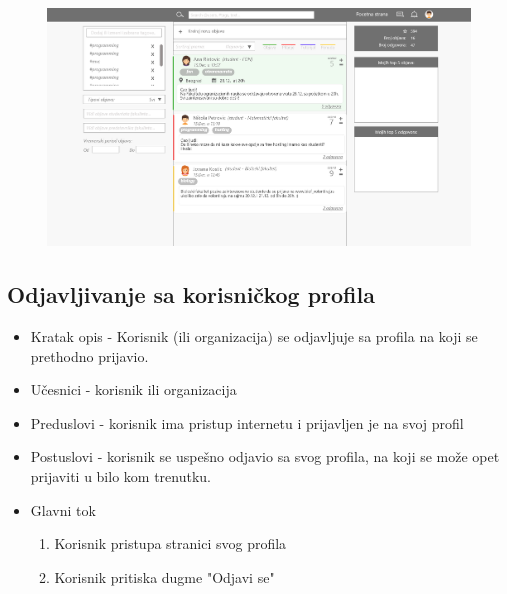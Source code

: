 \begin{figure}[h!]
		\centerline{\includegraphics[width=\textwidth]{slike/pocetna_strana.png}}
\end{figure}

\subsection{Odjavljivanje sa korisničkog profila}
\begin{itemize}
	\item Kratak opis - Korisnik (ili organizacija) se odjavljuje sa profila na koji se prethodno prijavio.
	\item Učesnici - korisnik ili organizacija
	\item Preduslovi - korisnik ima pristup internetu i prijavljen je na svoj profil
	\item Postuslovi - korisnik se uspešno odjavio sa svog profila, na koji se može opet prijaviti u bilo kom trenutku.
	\item Glavni tok
		\begin{enumerate}
			\item Korisnik pristupa stranici svog profila
			\item Korisnik pritiska dugme "Odjavi se"
		\end{enumerate}
\end{itemize}
